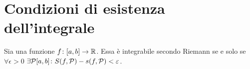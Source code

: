 \section{Condizioni di esistenza dell'integrale}
\begin{lemma}[di integrabilità] \label{l:integrabilita}
Sia una funzione $f\colon[a,b]\to\mathbb{R}$. Essa è integrabile secondo Riemann se e solo se $\forall\epsilon>0$ $\exists\mathcal{P}[a,b]\colon S(f,\mathcal{P})-s(f,\mathcal{P})<\varepsilon$.
\end{lemma}

